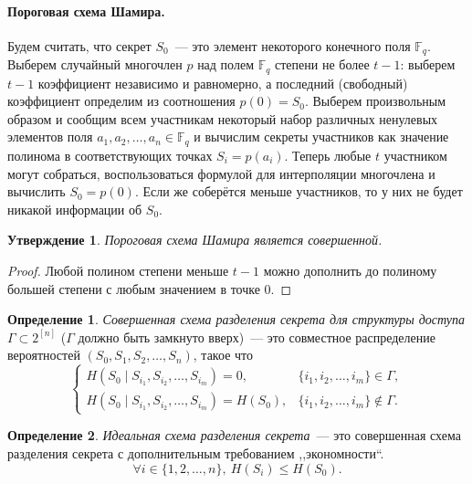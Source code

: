 \documentclass[12pt]{article}
\newcommand{\seqn}[2]{{#1}_1,{#1}_2,\dotsc,{#1}_{#2}}
\newcommand{\seqin}[3]{{#1}_{{#2}_1},{#1}_{{#2}_2},\dotsc,{#1}_{{#2}_{#3}}}
\theoremstyle{definition}
\newtheorem{definition}{Определение}
\theoremstyle{plain}
\newtheorem{statement}{Утверждение}[section]
\theoremstyle{remark}
\begin{document}
\paragraph{Пороговая схема Шамира.} Будем считать, что секрет $S_0$~--- это элемент некоторого конечного
поля $\mathbb{F}_q$. Выберем случайный многочлен $p$ над полем $\mathbb{F}_q$ степени не более
$t-1$: выберем $t-1$ коэффициент независимо и равномерно, а последний (свободный) коэффициент определим из
соотношения $p(0) = S_0$. Выберем произвольным образом и сообщим всем участникам некоторый
набор различных ненулевых элементов поля $\seqn{a}{n}\in\mathbb{F}_q$ и вычислим секреты участников
как значение полинома в соответствующих точках $S_i = p(a_i)$. Теперь любые $t$ участником могут
собраться, воспользоваться формулой для интерполяции многочлена и вычислить $S_0=p(0)$. Если же
соберётся меньше участников, то у них не будет никакой информации об $S_0$.
\begin{statement}
    Пороговая схема Шамира является совершенной.
\end{statement}
\begin{proof}
    Любой полином степени меньше $t-1$ можно дополнить до полиному большей степени с любым значением в точке $0$.
\end{proof}

\begin{definition}
    \emph{Совершенная схема разделения секрета для структуры доступа $\Gamma\subset
    2^{[n]}$} ($\Gamma$ должно быть замкнуто вверх)~--- это совместное распределение вероятностей
    $(S_0,\seqn{S}{n})$, такое что
    \[
    \begin{cases}
        H(S_0\mid\seqin{S}{i}{m}) = 0,      & \{\seqn{i}{m}\}\in\Gamma,\\
        H(S_0\mid\seqin{S}{i}{m}) = H(S_0), & \{\seqn{i}{m}\}\not\in\Gamma.
    \end{cases}
    \]
\end{definition}
\begin{definition}
    \emph{Идеальная схема разделения секрета}~--- это
    совершенная схема разделения секрета с дополнительным требованием ,,экономности``.
    \[
    \forall i\in\{1,2,\dotsc,n\},\ H(S_i)\le H(S_0).
    \]
\end{definition}
\end{document}
